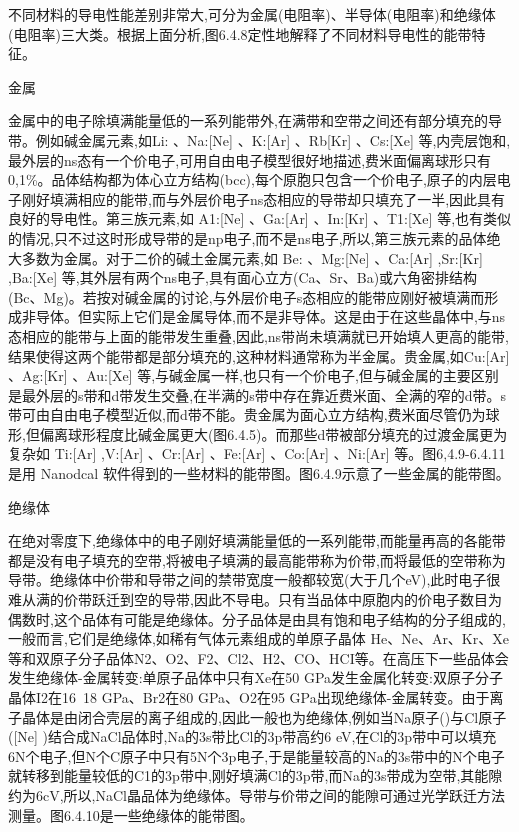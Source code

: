 不同材料的导电性能差别非常大,可分为金属(电阻率)、半导体(电阻率)和绝缘体(电阻率)三大类。根据上面分析,图6.4.8定性地解释了不同材料导电性的能带特征。



金属

金属中的电子除填满能量低的一系列能带外,在满带和空带之间还有部分填充的导带。例如碱金属元素,如Li: 、Na:[Ne] 、K:[Ar] 、Rb[Kr] 、Cs:[Xe] 等,内壳层饱和,最外层的ns态有一个价电子,可用自由电子模型很好地描述,费米面偏离球形只有0,1\%。品体结构都为体心立方结构(bcc),每个原胞只包含一个价电子,原子的内层电子刚好填满相应的能带,而与外层价电子ns态相应的导带却只填充了一半,因此具有良好的导电性。第三族元素,如 A1:[Ne] 、Ga:[Ar] 、In:[Kr] 、T1:[Xe] 等,也有类似的情况,只不过这时形成导带的是np电子,而不是ns电子,所以,第三族元素的品体绝大多数为金属。对于二价的碱土金属元素,如 Be: 、Mg:[Ne] 、Ca:[Ar] ,Sr:[Kr]  ,Ba:[Xe]  等,其外层有两个ns电子,具有面心立方(Ca、Sr、Ba)或六角密排结构(Bc、Mg)。若按对碱金属的讨论,与外层价电子s态相应的能带应刚好被填满而形成非导体。但实际上它们是金属导体,而不是非导体。这是由于在这些晶体中,与ns态相应的能带与上面的能带发生重叠,因此,ns带尚未填满就已开始填人更高的能带,结果使得这两个能带都是部分填充的,这种材料通常称为半金属。贵金属,如Cu:[Ar] 、Ag:[Kr] 、Au:[Xe] 等,与碱金属一样,也只有一个价电子,但与碱金属的主要区别是最外层的s带和d带发生交叠,在半满的s带中存在靠近费米面、全满的窄的d带。s带可由自由电子模型近似,而d带不能。贵金属为面心立方结构,费米面尽管仍为球形,但偏离球形程度比碱金属更大(图6.4.5)。而那些d带被部分填充的过渡金属更为复杂如 Ti:[Ar] ,V:[Ar] 、Cr:[Ar] 、Fe:[Ar] 、Co:[Ar] 、Ni:[Ar] 等。图6,4.9-6.4.11是用 Nanodcal 软件得到的一些材料的能带图。图6.4.9示意了一些金属的能带图。



绝缘体

在绝对零度下,绝缘体中的电子刚好填满能量低的一系列能带,而能量再高的各能带都是没有电子填充的空带,将被电子填满的最高能带称为价带,而将最低的空带称为导带。绝缘体中价带和导带之间的禁带宽度一般都较宽(大于几个eV),此时电子很难从满的价带跃迁到空的导带,因此不导电。只有当品体中原胞内的价电子数目为偶数时,这个品体有可能是绝缘体。分子品体是由具有饱和电子结构的分子组成的,一般而言,它们是绝缘体,如稀有气体元素组成的单原子晶体 He、Ne、Ar、Kr、Xe等和双原子分子品体N2、O2、F2、Cl2、H2、CO、HCI等。在高压下一些品体会发生绝缘体-金属转变:单原子品体中只有Xe在50 GPa发生金属化转变:双原子分子晶体I2在16~18 GPa、Br2在80 GPa、O2在95 GPa出现绝缘体-金属转变。由于离子晶体是由闭合壳层的离子组成的,因此一般也为绝缘体,例如当Na原子()与Cl原子([Ne] )结合成NaCl品体时,Na的3s带比Cl的3p带高约6 eV,在Cl的3p带中可以填充6N个电子,但N个C原子中只有5N个3p电子,于是能量较高的Na的3s带中的N个电子就转移到能量较低的C1的3p带中,刚好填满Cl的3p带,而Na的3s带成为空带,其能隙约为6cV,所以,NaCl晶品体为绝缘体。导带与价带之间的能隙可通过光学跃迁方法测量。图6.4.10是一些绝缘体的能带图。



